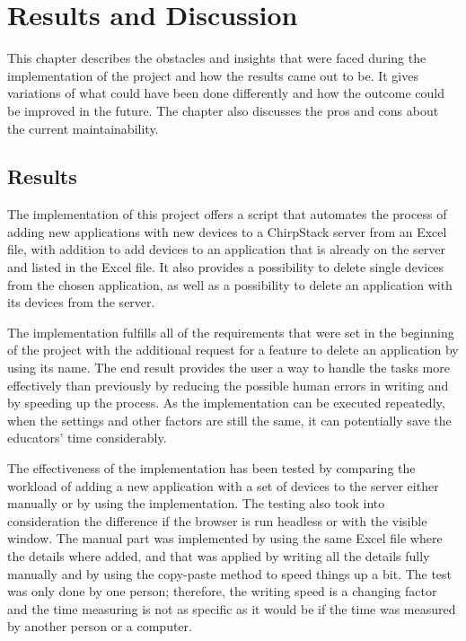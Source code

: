 
\chapter{Results and Discussion} \label{ch:res_and_disc}

This chapter describes the obstacles and insights that were faced during the implementation of the project and how the results came out to be.
It gives variations of what could have been done differently and how the outcome could be improved in the future.
The chapter also discusses the pros and cons about the current maintainability.

\section{Results}
The implementation of this project offers a script that automates the process of adding new applications with new devices to a ChirpStack server from an Excel file, with addition to add devices to an application that is already on the server and listed in the Excel file.
It also provides a possibility to delete single devices from the chosen application, as well as a possibility to delete an application with its devices from the server.

The implementation fulfills all of the requirements that were set in the beginning of the project with the additional request for a feature to delete an application by using its name.
The end result provides the user a way to handle the tasks more effectively than previously by reducing the possible human errors in writing and by speeding up the process.
As the implementation can be executed repeatedly, when the settings and other factors are still the same, it can potentially save the educators' time considerably.

The effectiveness of the implementation has been tested by comparing the workload of adding a new application with a set of devices to the server either manually or by using the implementation.
The testing also took into consideration the difference if the browser is run headless or with the visible window.
The manual part was implemented by using the same Excel file where the details where added, and that was applied by writing all the details fully manually and by using the copy-paste method to speed things up a bit.
The test was only done by one person; therefore, the writing speed is a changing factor and the time measuring is not as specific as it would be if the time was measured by another person or a computer.


